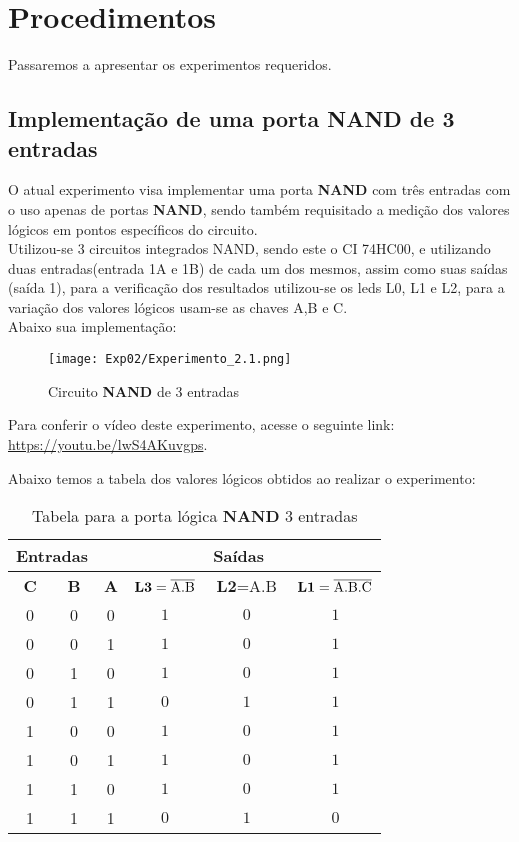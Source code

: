\documentclass[12pt]{article}
\begin{document}
\section{Procedimentos}
\label{sec:Procedimentos}

Passaremos a apresentar os experimentos requeridos.

\subsection{Implementação de uma porta \textbf{NAND} de 3 entradas}
\label{sec:led_chave}

O atual experimento visa implementar uma porta \textbf{NAND} com três entradas com o uso apenas de portas \textbf{NAND}, sendo também requisitado a medição dos valores lógicos em pontos específicos do circuito.\\
Utilizou-se 3 circuitos integrados NAND, sendo este o CI 74HC00, e utilizando duas entradas(entrada 1A e 1B) de cada um dos mesmos, assim como suas saídas (saída 1), para a verificação dos resultados utilizou-se os leds L0, L1 e L2, para a variação dos valores lógicos usam-se as chaves A,B e C.\\

Abaixo sua implementação:
\begin{figure}[H]
    \centering
    \texttt{[image: Exp02/Experimento\_2.1.png]}
    \caption{Circuito \textbf{NAND} de 3 entradas}
    \label{fig:Esquema_Experimento2_2.3}
\end{figure}

Para conferir o vídeo deste experimento, acesse o seguinte link:
\href{https://youtu.be/lwS4AKuvgps}{https://youtu.be/lwS4AKuvgps}.

Abaixo temos a tabela dos valores lógicos obtidos ao realizar o experimento:

\begin{table}[H]
    \centering
    \caption{Tabela para a porta lógica \textbf{NAND} 3 entradas}
    \begin{tabular}{|c|c|c|c|c|c|}
     \hline
    \multicolumn{2}{|c|}{Entradas} & \multicolumn{4}{|c|}{Saídas} \\
    \hline
    \textbf{C} & \textbf{B} & \textbf{A} & $\textbf{L3}=\overline{\rm A.B}$ & $\textbf{L2}=\text{A.B}$ & $\textbf{L1}=\overline{\rm A.B.C}$ \\
    \hline
    0 & 0  & 0 & \(1\) & \(0\) & \(1\) \\
    \hline
    0 & 0  & 1 & \(1\) & \(0\) & \(1\) \\
    \hline
    0 & 1  & 0 & \(1\) & \(0\) & \(1\) \\
    \hline
    0 & 1  & 1 & \(0\) & \(1\) & \(1\) \\
    \hline
    1 & 0  & 0 & \(1\) & \(0\) & \(1\) \\
    \hline
    1 & 0  & 1 & \(1\) & \(0\) & \(1\) \\
    \hline
    1 & 1  & 0 & \(1\) & \(0\) & \(1\) \\
    \hline
    1 & 1  & 1 & \(0\) & \(1\) & \(0\) \\
    \hline
    \end{tabular}\label{tab:tabela_and}
\end{table}
\end{document}
